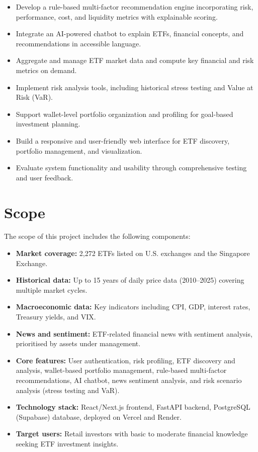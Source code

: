 \begin{itemize}
    \item Develop a rule-based multi-factor recommendation engine incorporating risk, performance, cost, and liquidity metrics with explainable scoring.
    \item Integrate an AI-powered chatbot to explain ETFs, financial concepts, and recommendations in accessible language.
    \item Aggregate and manage ETF market data and compute key financial and risk metrics on demand.
    \item Implement risk analysis tools, including historical stress testing and Value at Risk (VaR).
    \item Support wallet-level portfolio organization and profiling for goal-based investment planning.
    \item Build a responsive and user-friendly web interface for ETF discovery, portfolio management, and visualization.
    \item Evaluate system functionality and usability through comprehensive testing and user feedback.
\end{itemize}

\section{Scope}

The scope of this project includes the following components:

\begin{itemize}
    \item \textbf{Market coverage:} 2,272 ETFs listed on U.S. exchanges and the Singapore Exchange.
    \item \textbf{Historical data:} Up to 15 years of daily price data (2010--2025) covering multiple market cycles.
    \item \textbf{Macroeconomic data:} Key indicators including CPI, GDP, interest rates, Treasury yields, and VIX.
    \item \textbf{News and sentiment:} ETF-related financial news with sentiment analysis, prioritised by assets under management.
    \item \textbf{Core features:} User authentication, risk profiling, ETF discovery and analysis, wallet-based portfolio management, rule-based multi-factor recommendations, AI chatbot, news sentiment analysis, and risk scenario analysis (stress testing and VaR).
    \item \textbf{Technology stack:} React/Next.js frontend, FastAPI backend, PostgreSQL (Supabase) database, deployed on Vercel and Render.
    \item \textbf{Target users:} Retail investors with basic to moderate financial knowledge seeking ETF investment insights.
\end{itemize}

